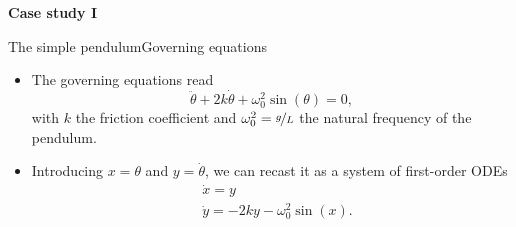 \documentclass[usenames,dvipsnames,svgnames,10pt,aspectratio=169]{beamer}
\begin{document}
\begin{frame}[t, c]{}{}
	\centering

	{\Large \textbf{Case study I}}

	\bigskip


	\vspace{-2cm}
\end{frame}

\begin{frame}[t, c]{The simple pendulum}{Governing equations}
	\begin{minipage}{.68\textwidth}
		\begin{itemize}
			\item The governing equations read
			\[
				\ddot{\theta} + 2k \dot{\theta} + \omega_0^2 \sin(\theta) = 0,
			\]
			with \( k \) the friction coefficient and \( \omega_0^2 = \nicefrac{g}{L} \) the natural frequency of the pendulum.

			\bigskip

			\item Introducing \( x = \theta \) and \( y = \dot{\theta} \), we can recast it as a system of first-order ODEs
			\[
				\begin{aligned}
					& \dot{x} = y \\
					& \dot{y} = -2k y - \omega_0^2 \sin(x).
				\end{aligned}
			\]

			\medskip


\end{itemize}
\end{minipage}
\end{frame}
\end{document}
